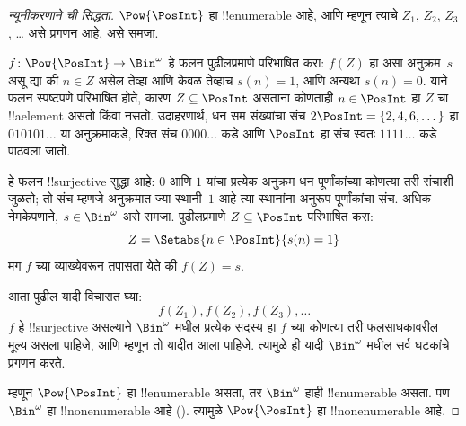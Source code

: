 \documentclass[../../../include/open-logic-section]{subfiles}
\begin{document}
\begin{proof}[न्यूनीकरणाने {} ची सिद्धता]
$\Pow{\PosInt}$ हा !!{enumerable} आहे, आणि म्हणून त्याचे $Z_{1}$,
$Z_{2}$, $Z_{3}$, \dots{} असे प्रगणन आहे, असे समजा.

$f \colon \Pow{\PosInt} \to \Bin^\omega$ हे फलन पुढीलप्रमाणे परिभाषित
करा: $f(Z)$ हा असा अनुक्रम~$s$ असू द्या की $n \in Z$ असेल तेव्हा
आणि केवळ तेव्हाच $s(n) = 1$, आणि अन्यथा $s(n) = 0$. याने
फलन स्पष्टपणे परिभाषित होते, कारण $Z \subseteq \PosInt$ असताना कोणताही
$n \in \PosInt$ हा $Z$ चा !!a{element} असतो किंवा नसतो. उदाहरणार्थ, धन सम संख्यांचा संच
$2\PosInt = \{2, 4, 6, \dots\}$ हा $010101\dots$ या अनुक्रमाकडे,
रिक्त संच $0000\dots$ कडे आणि $\PosInt$ हा संच स्वतः $1111\dots$ कडे
पाठवला जातो.

हे फलन !!{surjective} सुद्धा आहे: $0$ आणि $1$ यांचा प्रत्येक अनुक्रम धन
पूर्णांकांच्या कोणत्या तरी संचाशी जुळतो; तो संच म्हणजे अनुक्रमात ज्या
स्थानी~$1$ आहे त्या स्थानांना अनुरूप पूर्णांकांचा संच. अधिक नेमकेपणाने,
$s \in \Bin^\omega$ असे समजा. पुढीलप्रमाणे $Z \subseteq \PosInt$
परिभाषित करा:
\[
Z = \Setabs{n \in \PosInt}{s(n) = 1}
\]
मग $f$ च्या व्याख्येवरून तपासता येते की $f(Z) = s$.

आता पुढील यादी विचारात घ्या:
\[
f(Z_1), f(Z_2), f(Z_3), \dots
\]
$f$ हे !!{surjective} असल्याने $\Bin^\omega$ मधील प्रत्येक सदस्य हा
$f$ च्या कोणत्या तरी फलसाधकावरील मूल्य असला पाहिजे, आणि म्हणून तो
यादीत आला पाहिजे. त्यामुळे ही यादी $\Bin^\omega$ मधील सर्व घटकांचे
प्रगणन करते.

म्हणून $\Pow{\PosInt}$ हा !!{enumerable} असता, तर $\Bin^\omega$ हाही
!!{enumerable} असता. पण $\Bin^\omega$ हा !!{nonenumerable} आहे
(). त्यामुळे $\Pow{\PosInt}$ हा
!!{nonenumerable} आहे.
\end{proof}
\end{document}
